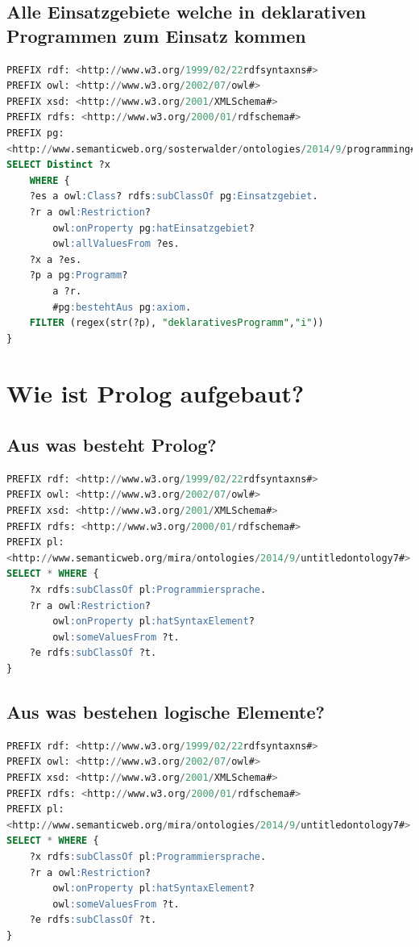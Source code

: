 \subsection{Alle Einsatzgebiete welche in deklarativen Programmen zum
Einsatz kommen}
\label{ssec:anh_beispiel_a_4}

\begin{lstlisting}[caption={Alle Einsatzgebiete welche in deklarativen Programmen zum
Einsatz kommen},captionpos=b,language=SQL]
PREFIX rdf: <http://www.w3.org/1999/02/22rdfsyntaxns#>
PREFIX owl: <http://www.w3.org/2002/07/owl#>
PREFIX xsd: <http://www.w3.org/2001/XMLSchema#>
PREFIX rdfs: <http://www.w3.org/2000/01/rdfschema#>
PREFIX pg: 
<http://www.semanticweb.org/sosterwalder/ontologies/2014/9/programming#>
SELECT Distinct ?x
	WHERE {
	?es a owl:Class? rdfs:subClassOf pg:Einsatzgebiet.
	?r a owl:Restriction? 
		owl:onProperty pg:hatEinsatzgebiet? 
		owl:allValuesFrom ?es.
	?x a ?es.
	?p a pg:Programm?
		a ?r.
		#pg:bestehtAus pg:axiom.
	FILTER (regex(str(?p), "deklarativesProgramm","i"))
}
\end{lstlisting}

\section{Wie ist Prolog aufgebaut?}
\label{sec:anh_beispiel_b}

\subsection{Aus was besteht Prolog?}
\label{ssec:anh_beispiel_b_1}
\begin{lstlisting}[caption={Aus was besteht Prolog?},captionpos=b,language=SQL]
PREFIX rdf: <http://www.w3.org/1999/02/22rdfsyntaxns#>
PREFIX owl: <http://www.w3.org/2002/07/owl#>
PREFIX xsd: <http://www.w3.org/2001/XMLSchema#>
PREFIX rdfs: <http://www.w3.org/2000/01/rdfschema#>
PREFIX pl: 
<http://www.semanticweb.org/mira/ontologies/2014/9/untitledontology7#>
SELECT * WHERE {
	?x rdfs:subClassOf pl:Programmiersprache.
	?r a owl:Restriction?
		owl:onProperty pl:hatSyntaxElement?
		owl:someValuesFrom ?t.
	?e rdfs:subClassOf ?t.
}
\end{lstlisting}

\newpage
\subsection{Aus was bestehen logische Elemente?}
\label{ssec:anh_beispiel_b_2}
\begin{lstlisting}[caption={Aus was bestehen logische Elemente?},captionpos=b,language=SQL]
PREFIX rdf: <http://www.w3.org/1999/02/22rdfsyntaxns#>
PREFIX owl: <http://www.w3.org/2002/07/owl#>
PREFIX xsd: <http://www.w3.org/2001/XMLSchema#>
PREFIX rdfs: <http://www.w3.org/2000/01/rdfschema#>
PREFIX pl: 
<http://www.semanticweb.org/mira/ontologies/2014/9/untitledontology7#>
SELECT * WHERE {
	?x rdfs:subClassOf pl:Programmiersprache.
	?r a owl:Restriction?
		owl:onProperty pl:hatSyntaxElement?
		owl:someValuesFrom ?t.
	?e rdfs:subClassOf ?t.
}
\end{lstlisting}

